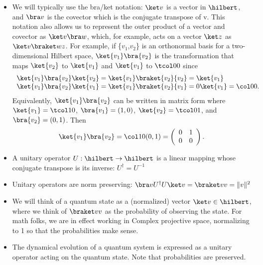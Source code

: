 \documentclass{slides}
\begin{document}
\begin{slide}{}
\begin{itemize}
	\item We will typically use the bra/ket notation: \newline
		$ \ket v $ is a vector in $\hilbert$, and \newline
		$ \bra v $ is the covector which is the conjugate transpose of v. \newline
		This notation also allows us to represent the outer product of a vector and
		covector as $\ket v \bra w$, which, for example, acts on a vector $\ket z$
		as $\ket v \braket w z$.
		 For example, if \{$v_1$,$v_2$\} is an orthonormal basis for a two-dimensional
		  Hilbert space, $\ket {v_1}\bra {v_2}$ is the transformation
			that maps $\ket {v_2}$ to $\ket {v_1}$ and $\ket {v_1}$ to $\tcol 00$ since
			$$\begin{array}{l}
			\ket {v_1}\bra {v_2}\ket {v_2} = \ket {v_1}\braket {v_2}{v_2} = \ket {v_1}\\
			\ket {v_1}\bra {v_2}\ket {v_1} = \ket {v_1}\braket {v_2}{v_1} = 0 \ket {v_1} = \col 00.\\
  			\end{array}$$
			Equivalently, $\ket {v_1}\bra {v_2}$ can be written in matrix form where
			$\ket {v_1} = \tcol 10$, $\bra {v_1} = (1, 0)$, $\ket {v_2} = \tcol 01$,
			 and $\bra {v_2} = (0, 1)$.
			Then 
			$$\ket {v_1}\bra {v_2} = \col 10 (0, 1) = 
					\left(\begin{array}{cc}0&1\\0&0\end{array}\right).$$
	\end{itemize}
\end{slide}

\begin{slide}{}
	\begin{itemize}		
	\item A unitary operator $ U : \hilbert \to \hilbert $ is a linear mapping
		whose conjugate transpose is its inverse:  $ U^\dag = U^{-1} $
	\item Unitary operators are norm preserving: \newline
		$ \bra v U^\dag U \ket v = \braket v v = \Vert v \Vert ^2 $
	\item We will think of a quantum state as a (normalized) vector $ \ket v \in \hilbert $,
		where we think of $\braket v v$ as the probability of observing the state.
		For math folks, we are in effect working in Complex projective space, normalizing
		to 1 so that the probabilities make sense.
	\item The dynamical evolution of a quantum system is expressed as a unitary operator acting on
		the quantum state.  Note that probabilities are preserved.
\end{itemize}
\end{slide}	
\end{document}
